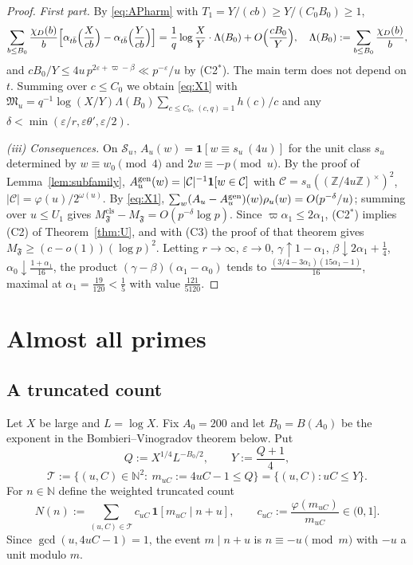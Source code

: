 \documentclass[11pt,reqno]{amsart}
\theoremstyle{definition}
\newcommand{\N}{\mathbb N}
\newcommand{\Z}{\mathbb Z}
\newcommand{\eps}{\varepsilon}
\newcommand{\cC}{\mathcal C}
\newcommand{\cF}{\mathfrak F}
\newcommand{\cS}{\mathcal S}
\newcommand{\cT}{\mathcal T}
\newcommand{\Mcls}{M^{\mathrm{cls}}}
\begin{document}
\begin{proof}
\emph{First part.}  By \eqref{eq:APharm} with $T_1=Y/(cb)\ge Y/(C_0B_0)\ge1$,
\[
 \sum_{b\le B_0}\frac{\chi_D(b)}b\Bigl[\alpha_{t\bar b}\Bigl(\frac X{cb}\Bigr)-\alpha_{t\bar
 b}\Bigl(\frac Y{cb}\Bigr)\Bigr]=\frac1q\log\frac XY\cdot\Lambda(B_0)+O\Bigl(\frac{cB_0}Y\Bigr),
 \quad\Lambda(B_0):=\sum_{b\le B_0}\frac{\chi_D(b)}b,
\]
and $cB_0/Y\le4u\,p^{2\eps+\varpi-\beta}\ll p^{-\eps}/u$ by (C2$^*$).  The
main term does not depend on $t$.  Summing over $c\le C_0$ we obtain
\eqref{eq:X1} with
$\mathfrak M_u=q^{-1}\log(X/Y)\Lambda(B_0)\sum_{c\le C_0,\,(c,q)=1}h(c)/c$ and
any $\delta<\min(\eps/r,\eps\theta',\eps/2)$.

\emph{(iii) Consequences.}  On $\cS_u$,
$A_u(w)=\mathbf 1[w\equiv s_u\ (4u)]$ for the unit class $s_u$ determined by
$w\equiv w_0\pmod 4$ and $2w\equiv-p\pmod u$.  By the proof of
Lemma~\ref{lem:subfamily}, $A_u^{\rm gen}(w)=|\cC|^{-1}\mathbf 1[w\in\cC]$
with $\cC=s_u((\Z/4u\Z)^\times)^2$, $|\cC|=\varphi(u)/2^{\omega(u)}$.  By
\eqref{eq:X1},
$\sum_w(A_u-A_u^{\rm gen})(w)\rho_u(w)=O(p^{-\delta}/u)$; summing over $u\le
U_1$ gives $\Mcls_\cF-M_\cF=O(p^{-\delta}\log p)$.  Since
$\varpi\alpha_1\le2\alpha_1$, (C2$^*$) implies (C2) of Theorem~\ref{thm:U}, and
with (C3) the proof of that theorem gives $M_\cF\ge(c-o(1))(\log p)^2$.
Letting $r\to\infty$, $\eps\to0$, $\gamma\uparrow1-\alpha_1$,
$\beta\downarrow2\alpha_1+\frac14$, $\alpha_0\downarrow\frac{1+\alpha_1}{16}$, the
product $(\gamma-\beta)(\alpha_1-\alpha_0)$ tends to
$\frac{(3/4-3\alpha_1)(15\alpha_1-1)}{16}$, maximal at
$\alpha_1=\frac{19}{120}<\frac15$ with value $\frac{121}{5120}$.
\end{proof}

\section{Almost all primes}\label{sec:almostall}

\subsection{A truncated count}
Let $X$ be large and $L=\log X$.  Fix $A_0=200$ and let $B_0=B(A_0)$ be
the exponent in the Bombieri--Vinogradov theorem below.  Put
\[
 Q:=X^{1/4}L^{-B_0/2},\qquad Y:=\frac{Q+1}4,
\]
\[
 \cT:=\{(u,C)\in\N^2:\ m_{uC}:=4uC-1\le Q\}=\{(u,C):uC\le Y\}.
\]
For $n\in\N$ define the weighted truncated count
\[
 N(n):=\sum_{(u,C)\in\cT}c_{uC}\,\mathbf 1[m_{uC}\mid n+u],\qquad
 c_{uC}:=\frac{\varphi(m_{uC})}{m_{uC}}\in(0,1].
\]
Since $\gcd(u,4uC-1)=1$, the event $m\mid n+u$ is $n\equiv-u\pmod m$ with
$-u$ a unit modulo $m$.
\end{document}
